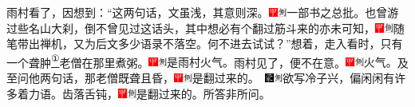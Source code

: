 雨村看了，因想到：``这两句话，文虽浅，其意则深。{\includegraphics[width=3mm]{../Images/00002}\includegraphics[width=3mm]{../Images/00011}\footnotesize \kaishu 一部书之总批。}也曾游过些名山大刹，倒不曾见过这话头，其中想必有个翻过筋斗来的亦未可知，{\includegraphics[width=3mm]{../Images/00002}\includegraphics[width=3mm]{../Images/00011}\footnotesize \kaishu 随笔带出禅机，又为后文多少语录不落空。}何不进去试试？''想着，走入看时，只有一个聋肿\href{../Text/part0006_split_000.html\#lnkback_1_a}{\textsuperscript{①}}老僧在那里煮粥。{\includegraphics[width=3mm]{../Images/00002}\includegraphics[width=3mm]{../Images/00011}\footnotesize \kaishu 是雨村火气。}雨村见了，便不在意。{\includegraphics[width=3mm]{../Images/00002}\includegraphics[width=3mm]{../Images/00011}\footnotesize \kaishu 火气。}及至问他两句话，那老僧既聋且昏，{{\includegraphics[width=3mm]{../Images/00002}\includegraphics[width=3mm]{../Images/00011}\footnotesize \kaishu 是翻过来的。　}\includegraphics[width=3mm]{../Images/00006}\includegraphics[width=3mm]{../Images/00011}\footnotesize \kaishu 欲写冷子兴，偏闲闲有许多着力语。}齿落舌钝，{\includegraphics[width=3mm]{../Images/00002}\includegraphics[width=3mm]{../Images/00011}\footnotesize \kaishu 是翻过来的。}所答非所问。

